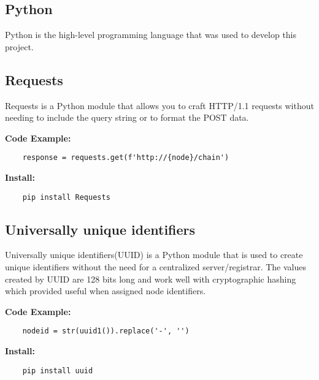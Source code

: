 \subsection{Python}

Python is the high-level programming language that was used to develop this project.

\subsection{Requests}

Requests is a Python module that allows you to craft HTTP/1.1 requests without needing to 
include the query string or to format the POST data.

\bigskip
\noindent
\textbf{Code Example:}
\begin{footnotesize}
\begin{verbatim}
    response = requests.get(f'http://{node}/chain')
\end{verbatim}
\end{footnotesize}
\noindent
\textbf{Install:}
\begin{footnotesize}
\begin{verbatim}
    pip install Requests
\end{verbatim}
\end{footnotesize}

\subsection{Universally unique identifiers}

Universally unique identifiers(UUID) is a Python module that is used to create unique 
identifiers without the need for a centralized server/registrar. The values created by UUID 
are 128 bits long and work well with cryptographic hashing which provided useful when assigned 
node identifiers.

\bigskip
\noindent
\textbf{Code Example:}
\begin{footnotesize}
\begin{verbatim}
    nodeid = str(uuid1()).replace('-', '')
\end{verbatim}
\end{footnotesize}
\noindent
\textbf{Install:}
\begin{footnotesize}
\begin{verbatim}
    pip install uuid
\end{verbatim}
\end{footnotesize}

